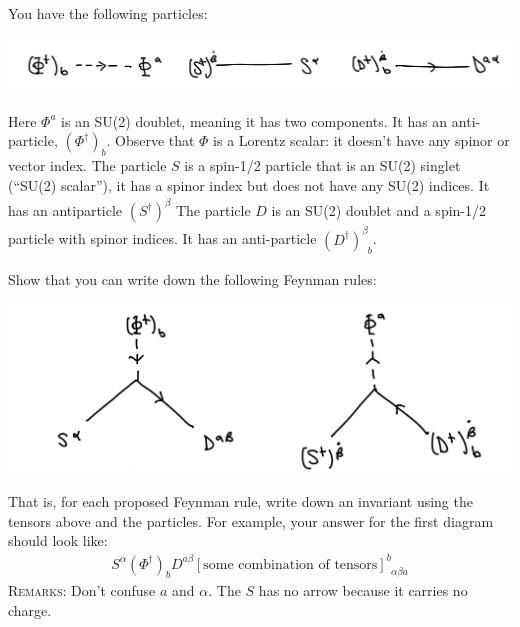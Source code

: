 \documentclass[12pt]{article}
\numberwithin{equation}{section}    %
\begin{document}
You have the following particles:
\begin{center}
	\includegraphics[width=.7\textwidth]{HW3a.png}
\end{center}
Here $\Phi^a$ is an SU(2) doublet, meaning it has two components. It has an anti-particle, $(\Phi^\dag)_b$. Observe that $\Phi$ is a Lorentz scalar: it doesn't have any spinor or vector index. The particle $S$ is a spin-1/2 particle that is an SU(2) singlet (``SU(2) scalar''), it has a spinor index but does not have any SU(2) indices. It has an antiparticle $(S^\dag)^{\dot \beta}$ The particle $D$ is an SU(2) doublet and a spin-1/2 particle with spinor indices. It has an anti-particle $(D^\dag)^{\dot \beta}_{\phantom\beta b}$.


Show that you can write down the following Feynman rules:
\begin{center}
	\includegraphics[width=.5\textwidth]{HW3aa.png}
\end{center}
That is, for each proposed Feynman rule, write down an invariant using the tensors above and the particles. For example,  your answer for the first diagram should look like:
\begin{align*}
	S^\alpha (\Phi^\dag)_b D^{a\beta} \left[\text{some combination of tensors}\right]^{b}_{\phantom{b}\alpha\beta a}
\end{align*}
\textsc{Remarks}: Don't confuse $a$ and $\alpha$. The $S$ has no arrow because it carries no charge.
\end{document}
